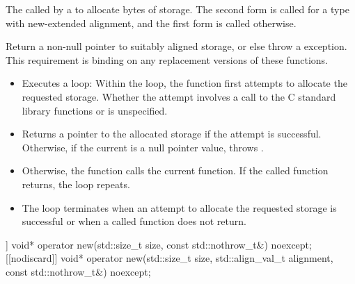 \begin{itemdescr}
\pnum
\effects
The
called by a
to allocate
 bytes of storage.
The second form is called for a type with new-extended alignment, and
the first form is called otherwise.

\pnum
\replaceable
{}

\pnum
\required
Return a non-null pointer to suitably aligned storage,
or else throw a
%
exception.
This requirement is binding on any replacement versions of these functions.

\pnum
{}
\begin{itemize}
\item
Executes a loop:
Within the loop, the function first attempts to allocate the requested storage.
Whether the attempt involves a call to the C standard library functions
 or 
is unspecified.
%
\item
Returns a pointer to the allocated storage if the attempt is successful.
Otherwise, if the
current  is
a null pointer value, throws
.
\item
Otherwise, the function calls the current
 function.
If the called function returns, the loop repeats.
\item
The loop terminates when an attempt to allocate the requested storage is
successful or when a called
function does not return.
\end{itemize}
\end{itemdescr}

%
\begin{itemdecl}
[[nodiscard]] void* operator new(std::size_t size, const std::nothrow_t&) noexcept;
[[nodiscard]] void* operator new(std::size_t size, std::align_val_t alignment,
                                 const std::nothrow_t&) noexcept;
\end{itemdecl}

